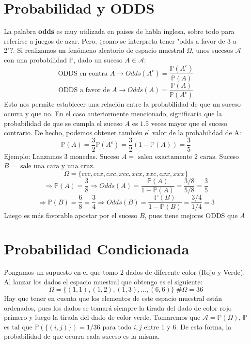 \documentclass[11pt]{article}
\newcommand{\prob}{\mathbb{P}}
\newcommand{\OMG}{\varOmega}
\theoremstyle{plain}
\begin{document}
    \section{Probabilidad y ODDS} %
    \label{sec:probabilidad_y_odds}
        La palabra \textbf{odds} es muy utilizada en paises de habla inglesa, sobre todo para referirse a juegos de azar. Pero, ¿como se interpreta tener "odds a favor de 3 a 2"?. Si realizamos un fenómeno aleatorio de espacio muestral $\OMG$, unos sucesos $\mathcal{A}$ con una probabilidad $\prob$, dado un suceso $A \in \mathcal{A}$:
        \begin{equation}
            \text{ODDS en contra $A$} \rightarrow Odds(A^c) = \frac{\prob(A^c)}{\prob(A)}
        \end{equation}
        \begin{equation}
            \text{ODDS a favor de $A$} \rightarrow Odds(A) = \frac{\prob(A)}{\prob(A^c)}
        \end{equation}
        Esto nos permite establecer una relación entre la probabilidad de que un suceso ocurra y que no. En el caso anteriormente mencionado, significaría que la probabilidad de que se cumpla el suceso $A$ es $1.5$ veces mayor que el suceso contrario. De hecho, podemos obtener también el valor de la probabilidad de A: \[\prob (A) = \frac{3}{2} \prob (A^c) = \frac{3}{2} (1 - \prob (A)) = \frac{3}{5}\]
        Ejemplo: Lanzamos 3 monedas. Suceso $A = \text{ salen exactamente 2 caras}$. Suceso $B = \text{ sale una cara y una cruz}$.
        \[\OMG = \{ccc,ccx,cxc,xcc,xcx,xxc,cxx,xxx\}\]
        \[\Rightarrow \prob(A) = \frac{3}{8} \Rightarrow Odds(A) = \frac{\prob(A)}{1-\prob(A)} = \frac{3/8}{5/8} = \frac{3}{5}\]
        \[\Rightarrow \prob(B) = \frac{6}{8} = \frac{3}{4} \Rightarrow Odds(B) = \frac{\prob(B)}{1-\prob(B)} = \frac{3/4}{1/4} = 3\]
        Luego es más favorable apostar por el suceso $B$, pues tiene mejores ODDS que $A$
    \section{Probabilidad Condicionada} %
    \label{sec:probabilidad_condicionada}
        Pongamos un supuesto en el que tomo 2 dados de diferente color (Rojo y Verde). Al lanzar los dados el espacio muestral que obtengo es el siguiente:
        \[\OMG = \{(1,1),(1,2),(1,3),... ,(6,6) \} \; \#\OMG = 36\]
        Hay que tener en cuenta que los elementos de este espacio muestral están ordenados, pues los dados se tomará siempre la tirada del dado de color rojo primero y luego la tirada del dado de color verde. Tomaremos que $\mathcal{A} = \prob(\OMG)$, $\prob$ es tal que $\prob(\{(i,j)\}) = 1/36$ para todo $i,j$ entre 1 y 6. De esta forma, la probabilidad de que ocurra cada suceso es la misma.\\
\end{document}
